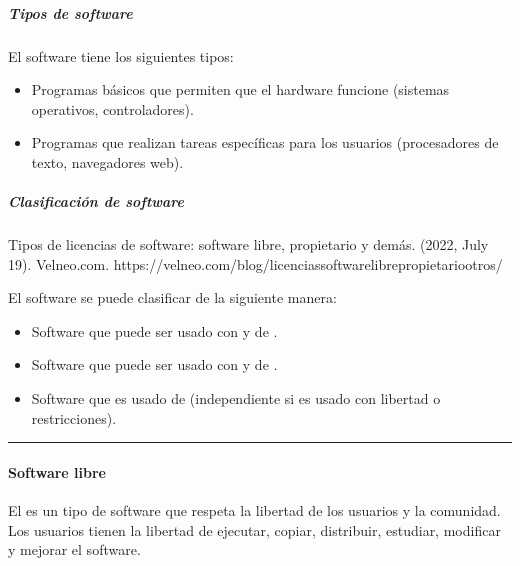 \documentclass[letterpaper,10pt,spanish]{sphinxmanual}
\begin{document}
\subparagraph{Tipos de software}
\label{\detokenize{cursos/ofimatica10/recursos/T02:tipos-de-software}}
\sphinxAtStartPar
\sphinxfootnotemark[1] El software tiene los siguientes tipos:
\begin{itemize}
\item {} 
\sphinxAtStartPar
{} Programas básicos que permiten que el hardware funcione (sistemas operativos, controladores).

\item {} 
\sphinxAtStartPar
{} Programas que realizan tareas específicas para los usuarios (procesadores de texto, navegadores web).

\end{itemize}


\subparagraph{Clasificación de software}
\label{\detokenize{cursos/ofimatica10/recursos/T02:clasificacion-de-software}}
\sphinxAtStartPar
%
\begin{footnote}[2]\sphinxAtStartFootnote
Tipos de licencias de software: software libre, propietario y demás. (2022, July 19). Velneo.com. https://velneo.com/blog/licencias\sphinxhyphen{}software\sphinxhyphen{}libre\sphinxhyphen{}propietario\sphinxhyphen{}otros/
%
\end{footnote} El software se puede clasificar de la siguiente manera:
\begin{itemize}
\item {} 
\sphinxAtStartPar
{} Software que puede ser usado con  y de .

\item {} 
\sphinxAtStartPar
{} Software que puede ser usado con  y de .

\item {} 
\sphinxAtStartPar
{} Software que es usado de  (independiente si es usado con libertad o restricciones).

\end{itemize}


\bigskip\hrule\bigskip



\paragraph{Software libre}
\label{\detokenize{cursos/ofimatica10/recursos/T02:software-libre}}
\sphinxAtStartPar
\sphinxfootnotemark[2] El  es un tipo de software que respeta la libertad de los usuarios y la comunidad. Los usuarios tienen la libertad de ejecutar, copiar, distribuir, estudiar, modificar y mejorar el software.
\end{document}
